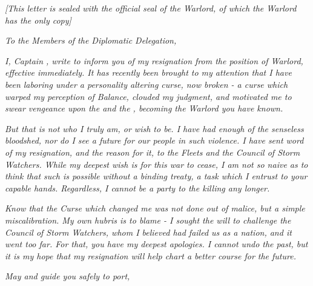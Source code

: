 \documentclass[white]{GL2020}
\begin{document}
\name{\wWarlordResignationOfficial{}}

\emph{[This letter is sealed with the official seal of the Warlord, of which the Warlord has the only copy]}

\vspace{1cm}

\textsl{To the Members of the \pShip{} Diplomatic Delegation,}

\vspace{0.5cm}

\textsl{I, Captain \cLoud{\full}, write to inform you of my resignation from the position of Warlord, effective immediately. It has recently been brought to my attention that I have been laboring under a personality altering curse, now broken - a curse which warped my perception of Balance, clouded my judgment, and motivated me to swear vengeance upon the \pFarm{} and the \pTech{}, becoming the Warlord you have known.}

\textsl{But that is not who I truly am, or wish to be. I have had enough of the senseless bloodshed, nor do I see a future for our people in such violence. I have sent word of my resignation, and the reason for it, to the Fleets and the Council of Storm Watchers. While my deepest wish is for this war to cease, I am not so naive as to think that such is possible without a binding treaty, a task which I entrust to your capable hands. Regardless, I cannot be a party to the killing any longer.}

\textsl{Know that the Curse which changed me was not done out of malice, but a simple miscalibration. My own hubris is to blame - I sought the will to challenge the Council of Storm Watchers, whom I believed had failed us as a nation, and it went too far. For that, you have my deepest apologies. I cannot undo the past, but it is my hope that my resignation will help chart a better course for the future.}

\vspace{0.5cm}

\textsl{May \cEbb{} and \cFlow{} guide you safely to port,}\\
\textsl{\cLoud{\full}}
\end{document}
